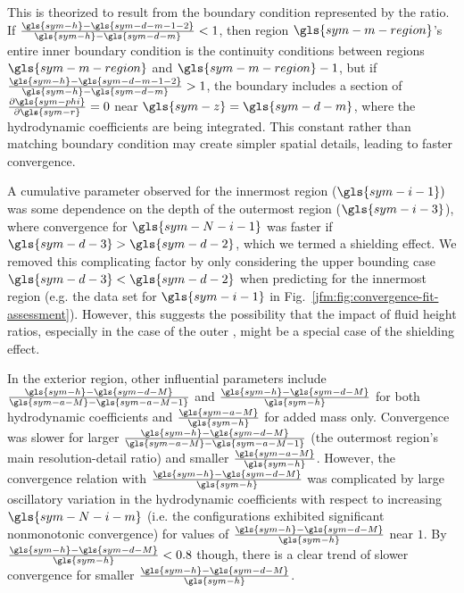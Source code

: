\documentclass[ASNA,twocolumn]{USG} %
\begin{document}
This is theorized to result from the boundary condition represented by the ratio.
If $\frac{\gls{sym-h}-\gls{sym-d-m-1-2}}{\gls{sym-h}-\gls{sym-d-m}} < 1$, then region $\gls{sym-m-region}$'s entire inner boundary condition is the continuity conditions between regions $\gls{sym-m-region}$ and $\gls{sym-m-region}-1$, but if $\frac{\gls{sym-h}-\gls{sym-d-m-1-2}}{\gls{sym-h}-\gls{sym-d-m}} > 1$, the boundary includes a section of $\frac{\partial \gls{sym-phi}}{\partial \gls{sym-r}} = 0$ near $\gls{sym-z} = \gls{sym-d-m}$, where the hydrodynamic coefficients are being integrated.
This constant rather than matching boundary condition may create simpler spatial details, leading to faster convergence.

A cumulative parameter observed for the innermost region ($\gls{sym-i-1})$ was some dependence on the depth of the outermost region ($\gls{sym-i-3}$), where convergence for $\gls{sym-N-i-1}$ was faster if $\gls{sym-d-3} > \gls{sym-d-2}$, which we termed a shielding effect. 
We removed this complicating factor by only considering the upper bounding case $\gls{sym-d-3} < \gls{sym-d-2}$ when predicting for the innermost region (e.g. the data set for $\gls{sym-i-1}$ in Fig.~\ref{jfm:fig:convergence-fit-assessment}). 
However, this suggests the possibility that the impact of fluid height ratios, especially in the case of the outer \neighbour{}, might be a special case of the shielding effect.

In the exterior region, other influential parameters include $\frac{\gls{sym-h}-\gls{sym-d-M}}{\gls{sym-a-M}-\gls{sym-a-M-1}}$ and $\frac{\gls{sym-h}-\gls{sym-d-M}}{\gls{sym-h}}$ for both hydrodynamic coefficients and $\frac{\gls{sym-a-M}}{\gls{sym-h}}$ for added mass only.
Convergence was slower for larger $\frac{\gls{sym-h}-\gls{sym-d-M}}{\gls{sym-a-M}-\gls{sym-a-M-1}}$ (the outermost region's main resolution-detail ratio) and smaller $\frac{\gls{sym-a-M}}{\gls{sym-h}}$.
However, the convergence relation with $\frac{\gls{sym-h}-\gls{sym-d-M}}{\gls{sym-h}}$ was complicated by large oscillatory variation in the hydrodynamic coefficients with respect to increasing $\gls{sym-N-i-m}$ (i.e. the configurations exhibited significant nonmonotonic convergence) for values of $\frac{\gls{sym-h}-\gls{sym-d-M}}{\gls{sym-h}}$ near $1$.
By $\frac{\gls{sym-h}-\gls{sym-d-M}}{\gls{sym-h}} < 0.8$ though, there is a clear trend of slower convergence for smaller $\frac{\gls{sym-h}-\gls{sym-d-M}}{\gls{sym-h}}$.
\end{document}
